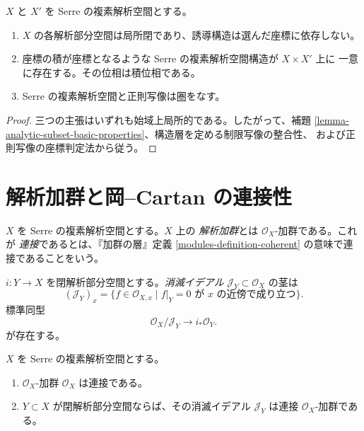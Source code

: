 \begin{lemma}
\label{lemma-serre-analytic-subspaces-products}
\begin{reference}
\cite[\S 1、第2項、5頁]{GAGA}
\end{reference}
$X$ と $X'$ を Serre の複素解析空間とする。
\begin{enumerate}
\item $X$ の各解析部分空間は局所閉であり、誘導構造は選んだ座標に依存しない。
\item 座標の積が座標となるような Serre の複素解析空間構造が $X\times X'$ 上に
一意に存在する。その位相は積位相である。
\item Serre の複素解析空間と正則写像は圏をなす。
\end{enumerate}
\end{lemma}

\begin{proof}
三つの主張はいずれも始域上局所的である。したがって、補題
\ref{lemma-analytic-subset-basic-properties}、構造層を定める制限写像の整合性、
および正則写像の座標判定法から従う。
\end{proof}


\section{解析加群と岡--Cartan の連接性}
\label{section-analytic-modules}

\begin{definition}
\label{definition-analytic-module}
\begin{reference}
\cite[\S 1、第3項、5頁]{GAGA}
\end{reference}
$X$ を Serre の複素解析空間とする。$X$ 上の {\it 解析加群}とは
$\mathcal O_X$-加群である。これが {\it 連接}であるとは、『加群の層』定義
\ref{modules-definition-coherent} の意味で連接であることをいう。
\end{definition}

\begin{definition}
\label{definition-vanishing-ideal-analytic-subspace}
$i:Y\to X$ を閉解析部分空間とする。{\it 消滅イデアル}
$\mathcal J_Y\subset\mathcal O_X$ の茎は
$$
(\mathcal J_Y)_x=
\{f\in\mathcal O_{X,x}\mid f|_Y=0\text{ が }x\text{ の近傍で成り立つ}\}.
$$
標準同型
$$
\mathcal O_X/\mathcal J_Y \longrightarrow i_*\mathcal O_Y.
$$
が存在する。
\end{definition}

\begin{theorem}
\label{theorem-oka-cartan-coherence}
\begin{reference}
\cite[\S 1、命題1、5--6頁]{GAGA}
\end{reference}
$X$ を Serre の複素解析空間とする。
\begin{enumerate}
\item $\mathcal O_X$-加群 $\mathcal O_X$ は連接である。
\item $Y\subset X$ が閉解析部分空間ならば、その消滅イデアル
$\mathcal J_Y$ は連接 $\mathcal O_X$-加群である。
\end{enumerate}
\end{theorem}

